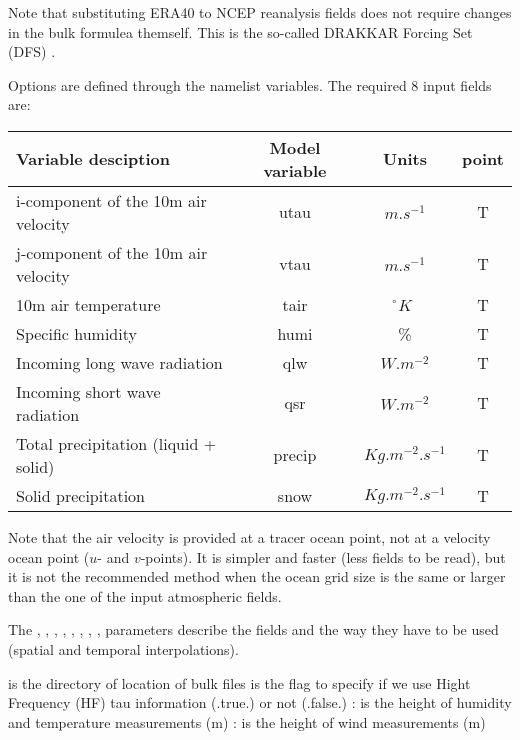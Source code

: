 \documentclass[../tex_main/NEMO_manual]{subfiles}
\begin{document}
Note that substituting ERA40 to NCEP reanalysis fields does not require changes in the bulk formulea themself.
This is the so-called DRAKKAR Forcing Set (DFS) \citep{Brodeau_al_OM09}.

Options are defined through the   namelist variables.
The required 8 input fields are:

\begin{table}[htbp]   \label{tab:CORE}
\begin{center}
\begin{tabular}{|l|c|c|c|}
\hline
Variable desciption					& Model variable	& Units	 & point \\		\hline
i-component of the 10m air velocity	& utau		& $m.s^{-1}$			& T  \\ 	\hline
j-component of the 10m air velocity	& vtau		& $m.s^{-1}$			& T  \\	\hline
10m air temperature					& tair		& \r{}$K$				& T 	\\	\hline
Specific humidity					& humi		& \%					& T \\		\hline
Incoming long wave radiation		& qlw		& $W.m^{-2}$			& T \\		\hline
Incoming short wave radiation		& qsr		& $W.m^{-2}$			& T \\		\hline
Total precipitation (liquid + solid)	& precip	& $Kg.m^{-2}.s^{-1}$	& T \\ 	\hline
Solid precipitation					& snow		& $Kg.m^{-2}.s^{-1}$	& T \\	\hline
\end{tabular}
\end{center}
\end{table}

Note that the air velocity is provided at a tracer ocean point, not at a velocity ocean point ($u$- and $v$-points).
It is simpler and faster (less fields to be read), but it is not the recommended method when
the ocean grid size is the same or larger than the one of the input atmospheric fields.

The , , , , , , ,
,  parameters describe the fields and the way they have to be used
(spatial and temporal interpolations). 

 is the directory of location of bulk files
 is the flag to specify if we use Hight Frequency (HF) tau information (.true.) or not (.false.)
: is the height of humidity and temperature measurements (m)
: is the height of wind measurements (m)
\end{document}
